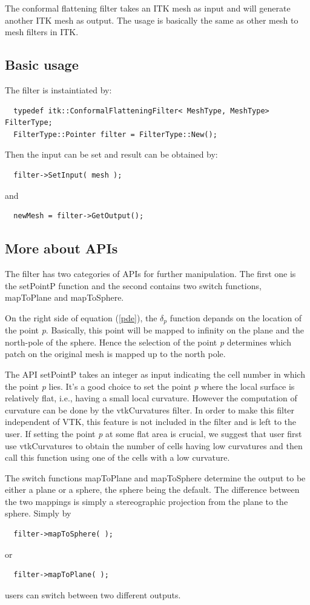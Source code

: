 \documentclass{InsightArticle}
\begin{document}
The conformal flattening filter takes an ITK mesh as input and will
generate another ITK mesh as output. The usage is basically the same
as other mesh to mesh filters in ITK.

\subsection{Basic usage}
The filter is instaintiated by:
\begin{verbatim}
  typedef itk::ConformalFlatteningFilter< MeshType, MeshType>  FilterType;
  FilterType::Pointer filter = FilterType::New();
\end{verbatim}
Then the input can be set and result can be obtained by:
\begin{verbatim}
  filter->SetInput( mesh ); 
\end{verbatim}
and
\begin{verbatim}
  newMesh = filter->GetOutput(); 
\end{verbatim}

\subsection{More about APIs}
The filter has two categories of APIs for further manipulation. The
first one is the setPointP function and the second contains two switch
functions, mapToPlane and mapToSphere.

On the right side of equation (\ref{pde}), the $\delta_p$ function
depands on the location of the point \emph{p}. Basically, this point
will be mapped to infinity on the plane and the north-pole of the
sphere. Hence the selection of the point \emph{p} determines which
patch on the original mesh is mapped up to the north pole.

The API setPointP takes an integer as input indicating the cell number
in which the point \emph{p} lies. It's a good choice to set the point
\emph{p} where the local surface is relatively flat, i.e., having a
small local curvature. However the computation of curvature can be
done by the vtkCurvatures filter. In order to make this filter
independent of VTK, this feature is not included in the filter and is
left to the user. If setting the point \emph{p} at some flat area is
crucial, we suggest that user first use vtkCurvatures to obtain the
number of cells having low curvatures and then call this function
using one of the cells with a low curvature.

The switch functions mapToPlane and mapToSphere determine the output
to be either a plane or a sphere, the sphere being the default. The
difference between the two mappings is simply a stereographic
projection from the plane to the sphere. Simply by
\begin{verbatim}
  filter->mapToSphere( ); 
\end{verbatim}
or
\begin{verbatim}
  filter->mapToPlane( ); 
\end{verbatim}
users can switch between two different outputs.
\end{document}
